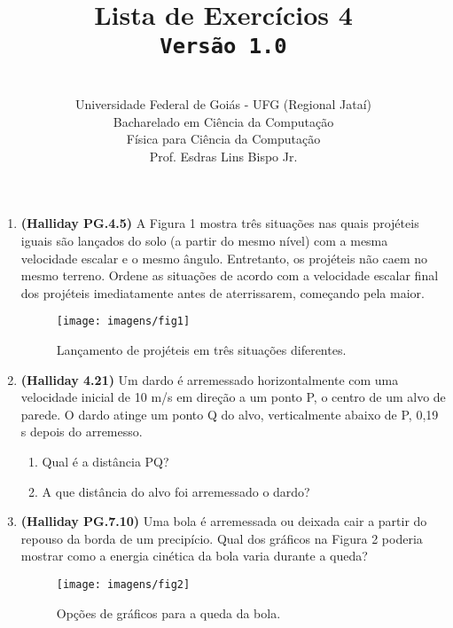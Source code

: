 \documentclass[12pt,a4paper,oneside]{article}
\author{\\Universidade Federal de Goiás - UFG (Regional Jataí) \\Bacharelado em Ciência da Computação \\Física para Ciência da Computação \\Prof. Esdras Lins Bispo Jr.}
\title{
	{\sc \huge Lista de Exercícios 4} 
	\\{\tt Versão 1.0}
}
\begin{document}
\maketitle

\begin{enumerate}

\section{Conceitos}
	
	\item {\bf (Halliday PG.4.5)} A Figura 1 mostra três situações nas quais projéteis iguais são lançados do solo (a partir do mesmo nível) com a mesma velocidade escalar e o mesmo ângulo. Entretanto, os projéteis não caem no mesmo terreno. Ordene as situações de acordo com a velocidade escalar final dos projéteis imediatamente antes de aterrissarem, começando pela maior. 
	
	\begin{figure}[htb]
		\begin{center}
			\texttt{[image: imagens/fig1]}
		\end{center}
		\caption{Lançamento de projéteis em três situações diferentes.}
	\end{figure}
	
	\item {\bf (Halliday 4.21)} Um dardo é arremessado horizontalmente com uma velocidade inicial de 10 m/s em direção a um ponto P, o centro de um alvo de parede. O dardo atinge um ponto Q do alvo, verticalmente abaixo de P, 0,19 s depois do arremesso. \label{q:dardo}
		\begin{enumerate}
			\item Qual é a distância PQ?
			\item A que distância do alvo foi arremessado o dardo?
		\end{enumerate}	
	
	\item {\bf (Halliday PG.7.10)} Uma bola é arremessada ou deixada cair a partir do repouso da borda de um precipício. Qual dos gráficos na Figura 2 poderia mostrar como a energia cinética da bola varia durante a queda?	 \label{q:bola}
	
	\begin{figure}[htb]
		\begin{center}
			\texttt{[image: imagens/fig2]}
		\end{center}
		\caption{Opções de gráficos para a queda da bola.}
	\end{figure}	


\end{enumerate}
\end{document}
